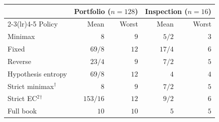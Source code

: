 \begin{tabular}{@{}lrrrr@{}}
\toprule
& \multicolumn{2}{c}{Portfolio ($n=128$)} & \multicolumn{2}{c}{Inspection ($n=16$)} \\
\cmidrule(lr){2-3}\cmidrule(lr){4-5}
Policy & Mean & Worst & Mean & Worst \\
\midrule
Minimax & $8$ & $9$ & $5/2$ & $3$ \\
Fixed & $69/8$ & $12$ & $17/4$ & $6$ \\
Reverse & $23/4$ & $9$ & $7/2$ & $5$ \\
Hypothesis entropy & $69/8$ & $12$ & $4$ & $4$ \\
Strict minimax$^{\dagger}$ & $8$ & $9$ & $7/2$ & $5$ \\
Strict EC$^2$$^{\dagger}$ & $153/16$ & $12$ & $9/2$ & $6$ \\
Full book & $10$ & $10$ & $5$ & $5$ \\
\bottomrule
\end{tabular}

